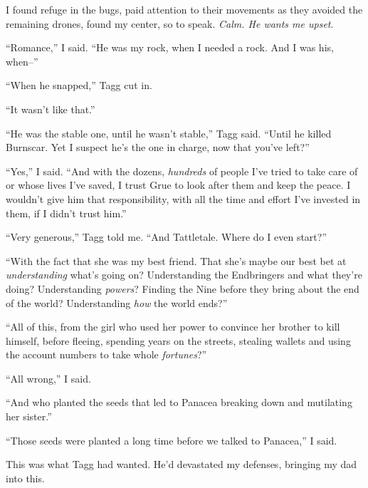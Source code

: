 I found refuge in the bugs, paid attention to their movements as they avoided the remaining drones, found my center, so to speak.  \emph{Calm.  He wants me upset}.



``Romance,'' I said.  ``He was my rock, when I needed a rock.  And I was his, when--''



``When he snapped,'' Tagg cut in.



``It wasn't like that.''



``He was the stable one, until he wasn't stable,'' Tagg said.  ``Until he killed Burnscar.  Yet I suspect he's the one in charge, now that you've left?''



``Yes,'' I said.  ``And with the dozens, \emph{hundreds} of people I've tried to take care of or whose lives I've saved, I trust Grue to look after them and keep the peace.  I wouldn't give him that responsibility, with all the time and effort I've invested in them, if I didn't trust him.''



``Very generous,'' Tagg told me.  ``And Tattletale.  Where do I even start?''



``With the fact that she was my best friend.  That she's maybe our best bet at \emph{understanding} what's going on?  Understanding the Endbringers and what they're doing?  Understanding \emph{powers}?  Finding the Nine before they bring about the end of the world?  Understanding \emph{how} the world ends?''



``All of this, from the girl who used her power to convince her brother to kill himself, before fleeing, spending years on the streets, stealing wallets and using the account numbers to take whole \emph{fortunes}?''



``All wrong,'' I said.



``And who planted the seeds that led to Panacea breaking down and mutilating her sister.''



``Those seeds were planted a long time before we talked to Panacea,'' I said.



This was what Tagg had wanted.  He'd devastated my defenses, bringing my dad into this.



